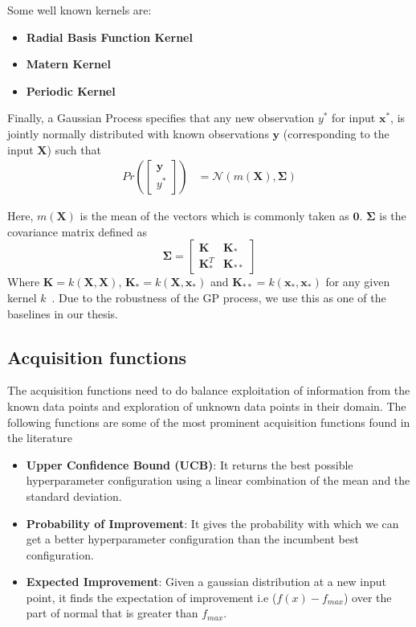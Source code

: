\documentclass[11pt]{report}
\begin{document}
Some well known kernels are:
\begin{itemize}
\item \textbf{Radial Basis Function Kernel}
\item \textbf{Matern Kernel}
\item \textbf{Periodic Kernel}
\end{itemize}

Finally,  a Gaussian Process specifies that any new observation $y^*$ for input $\textbf{x}^*$,  is jointly normally distributed with known observations $\textbf{y}$ (corresponding to the input $\textbf{X}$) such that
\begin{align}
    Pr\left( \begin{bmatrix}
           \textbf{y} \\
           y^*
         \end{bmatrix}
         \right)
         &=  \mathcal{N}\left(m(\textbf{X}), \mathbf{\Sigma}\right)
\end{align}

Here, $m(\textbf{X})$ is the mean of the vectors which is commonly taken as $\textbf{0}$.
$\mathbf{\Sigma}$ is the covariance matrix defined as
$$
\mathbf{\Sigma} = \begin{bmatrix}
           \textbf{K} & \textbf{K}_* \\
           \textbf{K}_*^T & \textbf{K}_{**}
         \end{bmatrix}
$$
  Where $\textbf{K} = k(\textbf{X}, \textbf{X})$,  $\textbf{K}_*  =  k(\textbf{X}, \textbf{x}_*)$ and $\textbf{K}_{**} = k(\textbf{x}_*,  \textbf{x}_*)$ for any given kernel $k$~\cite{GPTutorial}.
  Due to the robustness of the GP process, we use this as one of the baselines in our thesis.

\subsection{Acquisition functions}
The acquisition functions need to do balance exploitation of information from the known data points and exploration of unknown data points in their domain.
The following functions are some of the most prominent acquisition functions found in the literature~\cite{GPTutorial}
\begin{itemize}
\item \textbf{Upper Confidence Bound (UCB)}: It returns the best possible hyperparameter configuration using a linear combination of the mean and the standard deviation.
\item \textbf{Probability of Improvement}: It gives the probability with which we can get a better hyperparameter configuration than the incumbent best configuration.
\item \textbf{Expected Improvement}: Given a gaussian distribution at a new input point, it finds the expectation of improvement i.e ($f(x) - f_{max}$) over the part of normal that is greater than $f_{max}$.
\end{itemize}
\end{document}
